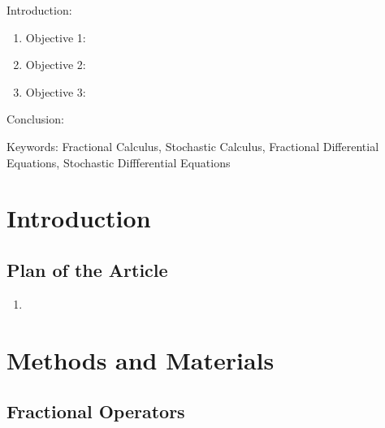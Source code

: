

\twocolumn
\scriptsize
\begin{frontmatter}
		\title{}
		\author{}
		\address{The Mathematical Learning Space}
\end{frontmatter}	

Introduction:
\begin{enumerate}
\item Objective 1:
\item Objective 2:
\item Objective 3:
\end{enumerate}
Conclusion:

Keywords: Fractional Calculus, Stochastic Calculus, Fractional Differential Equations, Stochastic Diffferential Equations

\section{Introduction}



\subsection{Plan of the Article}

\begin{enumerate}
\item 
\end{enumerate}

\section{Methods and Materials}

\subsection{Fractional Operators}

